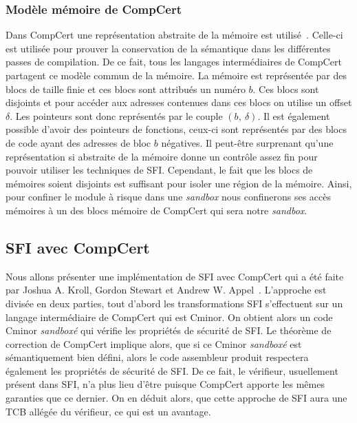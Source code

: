 \documentclass[11pt]{sdm}
\begin{document}
\subsubsection{Modèle mémoire de CompCert}

Dans CompCert une représentation abstraite de la mémoire est utilisé~\cite{compCert_memory_model}. Celle-ci est utilisée pour prouver la conservation de la sémantique dans les différentes passes de compilation. De ce fait, tous les langages intermédiaires de CompCert partagent ce modèle commun de la mémoire. La mémoire est représentée par des blocs de taille finie et ces blocs sont attribués un numéro $b$. Ces blocs sont disjoints et pour accéder aux adresses contenues dans ces blocs on utilise un offset $\delta$. Les pointeurs sont donc représentés par le couple $(b,~\delta)$. Il est également possible d'avoir des pointeurs de fonctions, ceux-ci sont représentés par des blocs de code ayant des adresses de bloc $b$ négatives.
Il peut-être surprenant qu'une représentation si abstraite de la mémoire donne un contrôle assez fin pour pouvoir utiliser les techniques de SFI. Cependant, le fait que les blocs de mémoires soient disjoints est suffisant pour isoler une région de la mémoire. Ainsi, pour confiner le module à risque dans une \textit{sandbox} nous confinerons ses accès mémoires à un des blocs mémoire de CompCert qui sera notre \textit{sandbox}.


\subsection{SFI avec CompCert}

Nous allons présenter une implémentation de SFI avec CompCert qui a été faite par Joshua A. Kroll, Gordon Stewart et Andrew W. Appel~\cite{Kroll:2014:PSF:2708449.2708686}.
 L'approche est divisée en deux parties, tout d'abord les transformations SFI s'effectuent sur un langage intermédiaire de CompCert qui est Cminor. On obtient alors un code Cminor \textit{sandboxé} qui vérifie les propriétés de sécurité de SFI. Le théorème de correction de CompCert implique alors, que si ce Cminor \textit{sandboxé} est sémantiquement bien défini, alors le code assembleur produit respectera également les propriétés de sécurité de SFI.
 De ce fait, le vérifieur, usuellement présent dans SFI, n'a plus lieu d'être puisque CompCert apporte les mêmes garanties que ce dernier. On en déduit alors, que cette approche de SFI aura une TCB allégée du vérifieur, ce qui est un avantage.
\end{document}

